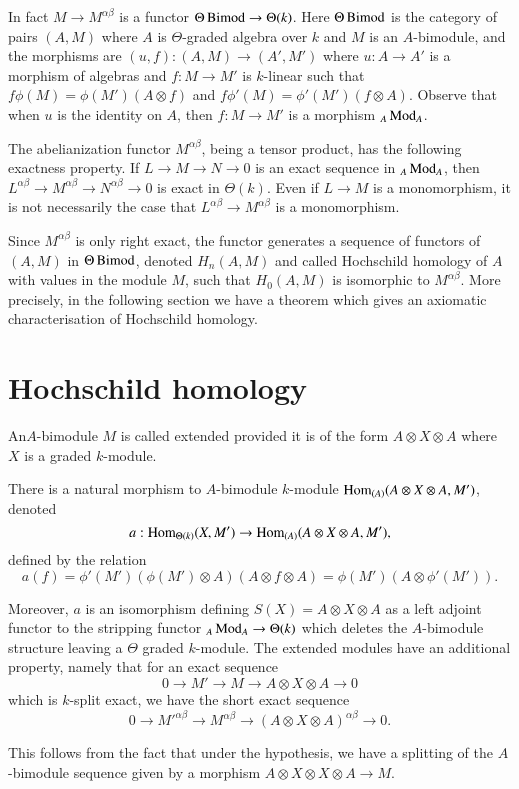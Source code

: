 In fact $M\to M^{\alpha\beta}$ is a functor $\Theta\operatorname{Bimod}\to
\Theta(k)$. Here $\Theta\operatorname{Bimod}$ is the category of pairs $(A,M)$ where
$A$ is $\Theta$-graded algebra over $k$ and $M$ is an $A$-bimodule,
and the morphisms are $(u,f):(A,M)\to (A',M')$ where $u:A\to A'$ is a
morphism of algebras and $f:M\to M'$ is $k$-linear such that
$f\phi(M)=\phi(M')(A\otimes f)$ and $f\phi'(M)=\phi'(M')(f\otimes
A)$. Observe that when $u$ is the identity on $A$, then $f:M\to M'$ is
a morphism ${}_{A}\operatorname{Mod}_{A}$.

\begin{remark}\label{chap2-rem5.6}
The abelianization functor $M^{\alpha\beta}$, being a tensor product,
has the following exactness property. If $L\to M\to N\to 0$ is an
exact sequence in ${}_{A}\operatorname{Mod}_{A}$, then $L^{\alpha\beta}\to
M^{\alpha\beta}\to N^{\alpha\beta}\to 0$ is exact in $\Theta(k)$. Even
if $L\to M$ is a monomorphism, it is not necessarily the case that
$L^{\alpha\beta}\to M^{\alpha\beta}$ is a monomorphism.
\end{remark}

Since $M^{\alpha\beta}$ is only right exact, the functor generates a
sequence of functors of $(A,M)$ in $\Theta\operatorname{Bimod}$, denoted
$H_{n}(A,M)$ and called Hochschild homology of $A$ with values in the
module $M$, such that $H_{0}(A,M)$ is isomorphic to
$M^{\alpha\beta}$. More precisely, in the following section we have a
theorem which gives an axiomatic characterisation of Hochschild
homology.

\section{Hochschild homology}\label{chap2-sec6}

\begin{definition}\label{chap2-defi6.1}
An\pageoriginale $A$-bimodule $M$ is called extended provided it is of the form
$A\otimes X\otimes A$ where $X$ is a graded $k$-module.
\end{definition}

\begin{remark}\label{chap2-rem6.2}
There is a natural morphism to $A$-bimodule $k$-module\break 
$\operatorname{Hom}_{(A)}(A\otimes X\otimes A,M')$, denoted
$$
a:\operatorname{Hom}_{\Theta(k)}(X,M')\to \operatorname{Hom}_{(A)}(A\otimes X\otimes A,M'),
$$
defined by the relation
$$
a(f)=\phi'(M')(\phi(M')\otimes A)(A\otimes f\otimes
A)=\phi(M')(A\otimes \phi'(M')).
$$

Moreover, $a$ is an isomorphism defining $S(X)=A\otimes X\otimes A$ as
a left adjoint functor to the stripping functor ${}_{A}\operatorname{Mod}_{A}\to
\Theta(k)$ which deletes the $A$-bimodule structure leaving a $\Theta$
graded $k$-module. The extended modules have an additional property,
namely that for an exact sequence
$$
0\to M'\to M\to A\otimes X\otimes A\to 0
$$
which is $k$-split exact, we have the short exact sequence
$$
0\to {M'}^{\alpha\beta}\to M^{\alpha\beta}\to (A\otimes X\otimes
A)^{\alpha\beta}\to 0.
$$

This follows from the fact that under the hypothesis, we have a
splitting of the $A$-bimodule sequence given by a morphism $A\otimes
X\otimes X\otimes A\to M$.
\end{remark}

